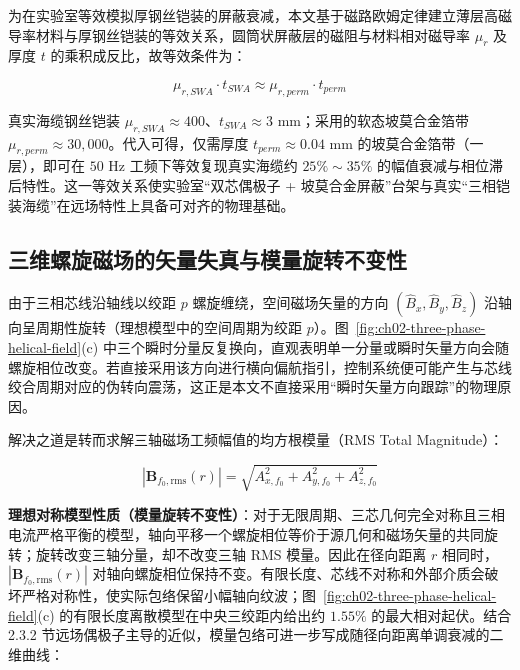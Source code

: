 为在实验室等效模拟厚钢丝铠装的屏蔽衰减，本文基于磁路欧姆定律建立薄层高磁导率材料与厚钢丝铠装的等效关系，圆筒状屏蔽层的磁阻与材料相对磁导率 \(\mu_r\) 及厚度 \(t\) 的乘积成反比，故等效条件为：

\begin{equation}
\mu_{r,SWA} \cdot t_{SWA} \approx \mu_{r,perm} \cdot t_{perm}
\label{eq:ch02-shield-equivalence}
\end{equation}

真实海缆钢丝铠装 \(\mu_{r,SWA} \approx 400\)、\(t_{SWA} \approx 3\text{ mm}\)；采用的软态坡莫合金箔带 \(\mu_{r,perm} \approx 30{,}000\)。代入可得，仅需厚度 \(t_{perm} \approx 0.04\text{ mm}\) 的坡莫合金箔带（一层），即可在 \(50\text{ Hz}\) 工频下等效复现真实海缆约 \(25\%\sim35\%\) 的幅值衰减与相位滞后特性。这一等效关系使实验室``双芯偶极子 + 坡莫合金屏蔽''台架与真实``三相铠装海缆''在远场特性上具备可对齐的物理基础。

\subsection{三维螺旋磁场的矢量失真与模量旋转不变性}\label{sec:ch02-2-3-4}

由于三相芯线沿轴线以绞距 \(p\) 螺旋缠绕，空间磁场矢量的方向 \((\hat{B}_x, \hat{B}_y, \hat{B}_z)\) 沿轴向呈周期性旋转（理想模型中的空间周期为绞距 \(p\)）。图~\ref{fig:ch02-three-phase-helical-field}(c) 中三个瞬时分量反复换向，直观表明单一分量或瞬时矢量方向会随螺旋相位改变。若直接采用该方向进行横向偏航指引，控制系统便可能产生与芯线绞合周期对应的伪转向震荡，这正是本文不直接采用``瞬时矢量方向跟踪''的物理原因。

解决之道是转而求解三轴磁场工频幅值的均方根模量（RMS Total Magnitude）：

\begin{equation}
|\boldsymbol{B}_{f_0,\mathrm{rms}}(r)| = \sqrt{A_{x,f_0}^2 + A_{y,f_0}^2 + A_{z,f_0}^2}
\label{eq:ch02-rms-magnitude}
\end{equation}

\textbf{理想对称模型性质（模量旋转不变性）}：对于无限周期、三芯几何完全对称且三相电流严格平衡的模型，轴向平移一个螺旋相位等价于源几何和磁场矢量的共同旋转；旋转改变三轴分量，却不改变三轴 RMS 模量。因此在径向距离 \(r\) 相同时，\(|\boldsymbol{B}_{f_0,\mathrm{rms}}(r)|\) 对轴向螺旋相位保持不变。有限长度、芯线不对称和外部介质会破坏严格对称性，使实际包络保留小幅轴向纹波；图~\ref{fig:ch02-three-phase-helical-field}(c) 的有限长度离散模型在中央三绞距内给出约 \(1.55\%\) 的最大相对起伏。结合 2.3.2 节远场偶极子主导的近似，模量包络可进一步写成随径向距离单调衰减的二维曲线：

